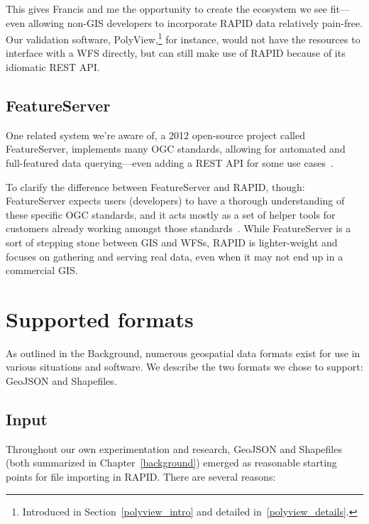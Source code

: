 This gives Francis and me the opportunity to create the ecosystem we see fit---even allowing non-GIS developers to incorporate RAPID data relatively pain-free. Our validation software, PolyView,\footnote{Introduced in Section~\ref{polyview_intro} and detailed in~\ref{polyview_details}.} for instance, would not have the resources to interface with a WFS directly, but can still make use of RAPID because of its idiomatic REST API.

\subsection{FeatureServer}

One related system we're aware of, a 2012 open-source project called FeatureServer, implements many OGC standards, allowing for automated and full-featured data querying---even adding a REST API for some use cases~\cite{FeatureServ}.

To clarify the difference between FeatureServer and RAPID, though: FeatureServer expects users (developers) to have a thorough understanding of these specific OGC standards, and it acts mostly as a set of helper tools for customers already working amongst those standards~\cite{FeatureServ}. While FeatureServer is a sort of stepping stone between GIS and WFSs, RAPID is lighter-weight and focuses on gathering and serving real data, even when it may not end up in a commercial GIS.

\section{Supported formats}
As outlined in the Background, numerous geospatial data formats exist for use in various situations and software. We describe the two formats we chose to support: GeoJSON and Shapefiles.

\subsection{Input}

Throughout our own experimentation and research, GeoJSON and Shapefiles (both summarized in Chapter~\ref{background}) emerged as reasonable starting points for file importing in RAPID. There are several reasons:

